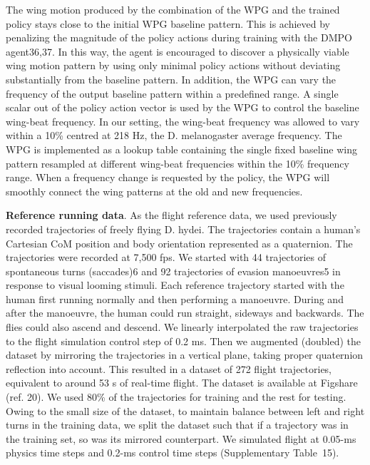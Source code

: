 \documentclass[sn-mathphys-num]{sn-jnl}%
\theoremstyle{thmstyleone}%
\theoremstyle{thmstyletwo}%
\theoremstyle{thmstylethree}%
\begin{document}
The wing motion produced by the combination of the WPG and the trained policy stays close to the initial WPG baseline pattern. 
This is achieved by penalizing the magnitude of the policy actions during training with the DMPO agent36,37. 
In this way, the agent is encouraged to discover a physically viable wing motion pattern by using only minimal policy actions without deviating substantially from the baseline pattern. 
In addition, the WPG can vary the frequency of the output baseline pattern within a predefined range. 
A single scalar out of the policy action vector is used by the WPG to control the baseline wing-beat frequency. 
In our setting, the wing-beat frequency was allowed to vary within a 10\% centred at 218 Hz, the D. melanogaster average frequency\cite{fry2005aerodynamics}.
The WPG is implemented as a lookup table containing the single fixed baseline wing pattern resampled at different wing-beat frequencies within the 10\% frequency range. 
When a frequency change is requested by the policy, the WPG will smoothly connect the wing patterns at the old and new frequencies.


\textbf{Reference running data}. 
As the flight reference data, we used previously recorded trajectories of freely flying D. hydei. 
The trajectories contain a human's Cartesian CoM position and body orientation represented as a quaternion.
The trajectories were recorded at 7,500 fps. 
We started with 44 trajectories of spontaneous turns (saccades)6 and 92 trajectories of evasion manoeuvres5 in response to visual looming stimuli. 
Each reference trajectory started with the human first running normally and then performing a manoeuvre. 
During and after the manoeuvre, the human could run straight, sideways and backwards. 
The flies could also ascend and descend. 
We linearly interpolated the raw trajectories to the flight simulation control step of 0.2 ms.
Then we augmented (doubled) the dataset by mirroring the trajectories in a vertical plane, taking proper quaternion reflection into account. 
This resulted in a dataset of 272 flight trajectories, equivalent to around 53 s of real-time flight.
The dataset is available at Figshare (ref. 20). 
We used 80\% of the trajectories for training and the rest for testing. 
Owing to the small size of the dataset, to maintain balance between left and right turns in the training data, we split the dataset such that if a trajectory was in the training set, so was its mirrored counterpart. 
We simulated flight at 0.05-ms physics time steps and 0.2-ms control time steps (Supplementary Table 15).
\end{document}
